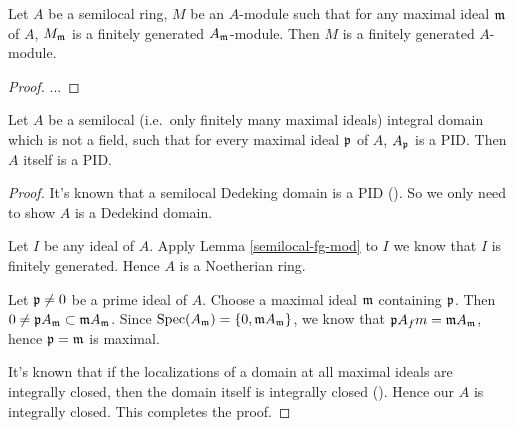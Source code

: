 \begin{lem}
\label{semilocal-fg-mod}
Let $A$ be a semilocal ring, $M$ be an $A$-module such that
for any maximal ideal ${\mathfrak{m}}$ of $A$, $M_{\mathfrak{m}}$ is a finitely generated $A_{\mathfrak{m}}$-module.
Then $M$ is a finitely generated $A$-module.
\end{lem}

\begin{proof}
...
\end{proof}

\begin{lem}
\label{semilocal-PID}
\leanok
Let $A$ be a semilocal (i.e.~only finitely many maximal ideals)
integral domain which is not a field,
such that for every maximal ideal ${\mathfrak{p}}$ of $A$, $A_{\mathfrak{p}}$ is a PID.
Then $A$ itself is a PID.
\end{lem}

\begin{proof}
It's known that a semilocal Dedeking domain is a PID
().
So we only need to show $A$ is a Dedekind domain.

Let $I$ be any ideal of $A$. Apply Lemma \ref{semilocal-fg-mod} to $I$ we know that
$I$ is finitely generated. Hence $A$ is a Noetherian ring.

Let ${\mathfrak{p}}\neq 0$ be a prime ideal of $A$.
Choose a maximal ideal ${\mathfrak{m}}$ containing ${\mathfrak{p}}$.
Then $0\neq{\mathfrak{p}} A_{\mathfrak{m}}\subset{\mathfrak{m}} A_{\mathfrak{m}}$. Since ${\mathrm{Spec}}(A_{\mathfrak{m}})=\{0,{\mathfrak{m}} A_{\mathfrak{m}}\}$,
we know that ${\mathfrak{p}} A_fm={\mathfrak{m}} A_{\mathfrak{m}}$, hence ${\mathfrak{p}}={\mathfrak{m}}$ is maximal.

It's known that if the localizations of a domain at all maximal ideals
are integrally closed, then the domain itself is integrally closed
().
Hence our $A$ is integrally closed. This completes the proof.
\end{proof}

